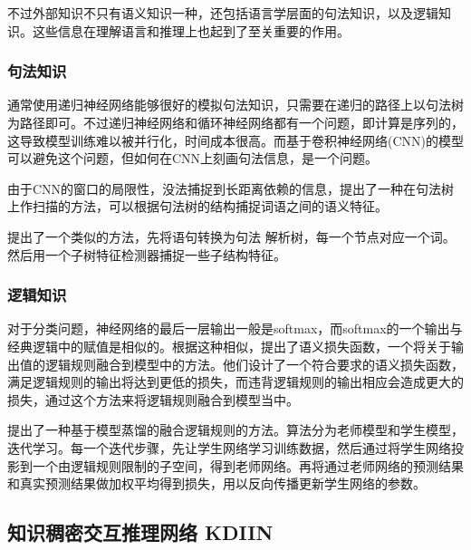 \documentclass[UTF8,11pt,a4paper,nofonts]{ctexart}
\numberwithin{equation}{section}
\begin{document}
不过外部知识不只有语义知识一种，还包括语言学层面的句法知识，以及逻辑知识。这些信息在理解语言和推理上也起到了至关重要的作用。

\subsubsection{句法知识}

通常使用递归神经网络能够很好的模拟句法知识，只需要在递归的路径上以句法树为路径即可\cite{Socher2012SemanticCT}。不过递归神经网络和循环神经网络都有一个问题，即计算是序列的，这导致模型训练难以被并行化，时间成本很高。而基于卷积神经网络(CNN)的模型可以避免这个问题，但如何在CNN上刻画句法信息，是一个问题。

由于CNN的窗口的局限性，没法捕捉到长距离依赖的信息，\cite{Ma2015DependencybasedCN}提出了一种在句法树上作扫描的方法，可以根据句法树的结构捕捉词语之间的语义特征。

\cite{Mou2016NaturalLI}提出了一个类似的方法，先将语句转换为句法
解析树，每一个节点对应一个词。然后用一个子树特征检测器捕捉一些子结构特征。

\subsubsection{逻辑知识}

对于分类问题，神经网络的最后一层输出一般是softmax，而softmax的一个输出与经典逻辑中的赋值是相似的。根据这种相似，\cite{Xu2017ASL}提出了语义损失函数，一个将关于输出值的逻辑规则融合到模型中的方法。他们设计了一个符合要求的语义损失函数，满足逻辑规则的输出将达到更低的损失，而违背逻辑规则的输出相应会造成更大的损失，通过这个方法来将逻辑规则融合到模型当中。

\cite{Hu2016HarnessingDN, Hu2016DeepNN}提出了一种基于模型蒸馏的融合逻辑规则的方法。算法分为老师模型和学生模型，迭代学习。每一个迭代步骤，先让学生网络学习训练数据，然后通过将学生网络投影到一个由逻辑规则限制的子空间，得到老师网络。再将通过老师网络的预测结果和真实预测结果做加权平均得到损失，用以反向传播更新学生网络的参数。






\newpage
\begin{center}
\section{知识稠密交互推理网络 KDIIN}
\end{center}
\par
\end{document}
